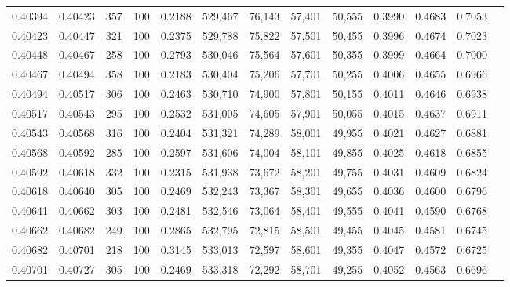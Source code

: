 \begin{tabular}{rrrrrrrrrrrrr}
0.40394 & 0.40423 &    357 & 100 &                                     0.2188 & 529,467 &  76,143 &  57,401 &  50,555 & 0.3990 & 0.4683 & 0.7053 \\
0.40423 & 0.40447 &    321 & 100 &                                     0.2375 & 529,788 &  75,822 &  57,501 &  50,455 & 0.3996 & 0.4674 & 0.7023 \\
0.40448 & 0.40467 &    258 & 100 &                                     0.2793 & 530,046 &  75,564 &  57,601 &  50,355 & 0.3999 & 0.4664 & 0.7000 \\
0.40467 & 0.40494 &    358 & 100 &                                     0.2183 & 530,404 &  75,206 &  57,701 &  50,255 & 0.4006 & 0.4655 & 0.6966 \\
0.40494 & 0.40517 &    306 & 100 &                                     0.2463 & 530,710 &  74,900 &  57,801 &  50,155 & 0.4011 & 0.4646 & 0.6938 \\
0.40517 & 0.40543 &    295 & 100 &                                     0.2532 & 531,005 &  74,605 &  57,901 &  50,055 & 0.4015 & 0.4637 & 0.6911 \\
0.40543 & 0.40568 &    316 & 100 &                                     0.2404 & 531,321 &  74,289 &  58,001 &  49,955 & 0.4021 & 0.4627 & 0.6881 \\
0.40568 & 0.40592 &    285 & 100 &                                     0.2597 & 531,606 &  74,004 &  58,101 &  49,855 & 0.4025 & 0.4618 & 0.6855 \\
0.40592 & 0.40618 &    332 & 100 &                                     0.2315 & 531,938 &  73,672 &  58,201 &  49,755 & 0.4031 & 0.4609 & 0.6824 \\
0.40618 & 0.40640 &    305 & 100 &                                     0.2469 & 532,243 &  73,367 &  58,301 &  49,655 & 0.4036 & 0.4600 & 0.6796 \\
0.40641 & 0.40662 &    303 & 100 &                                     0.2481 & 532,546 &  73,064 &  58,401 &  49,555 & 0.4041 & 0.4590 & 0.6768 \\
0.40662 & 0.40682 &    249 & 100 &                                     0.2865 & 532,795 &  72,815 &  58,501 &  49,455 & 0.4045 & 0.4581 & 0.6745 \\
0.40682 & 0.40701 &    218 & 100 &                                     0.3145 & 533,013 &  72,597 &  58,601 &  49,355 & 0.4047 & 0.4572 & 0.6725 \\
0.40701 & 0.40727 &    305 & 100 &                                     0.2469 & 533,318 &  72,292 &  58,701 &  49,255 & 0.4052 & 0.4563 & 0.6696 \\

\end{tabular}
